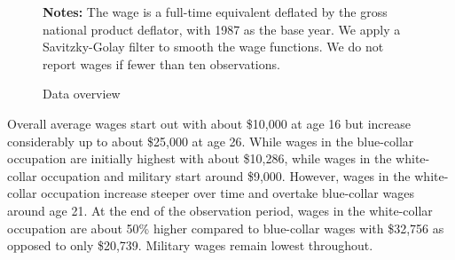 \begin{figure}[h!]\centering
\caption{Data overview}\label{Overview}
\hspace{0.3cm}
\begin{center}
\begin{minipage}[t]{0.80\columnwidth}
\item \scriptsize{\textbf{Notes:} The wage is a full-time equivalent deflated by the gross national product deflator, with 1987 as the base year. We apply a Savitzky-Golay filter \citep{Savitzky.1964} to smooth the wage functions. We do not report wages if fewer than ten observations.}
\end{minipage}
\end{center}
\end{figure}\FloatBarrier
%
\noindent Overall average wages start out with about \$10,000 at age 16 but increase considerably up to about \$25,000 at age 26. While wages in the blue-collar occupation are initially highest with about \$10,286, while wages in the white-collar occupation and military start around \$9,000. However, wages in the white-collar occupation increase steeper over time and overtake blue-collar wages around age 21. At the end of the observation period, wages in the white-collar occupation are about 50\% higher compared to blue-collar wages with \$32,756 as opposed to only \$20,739. Military wages remain lowest throughout.\\

